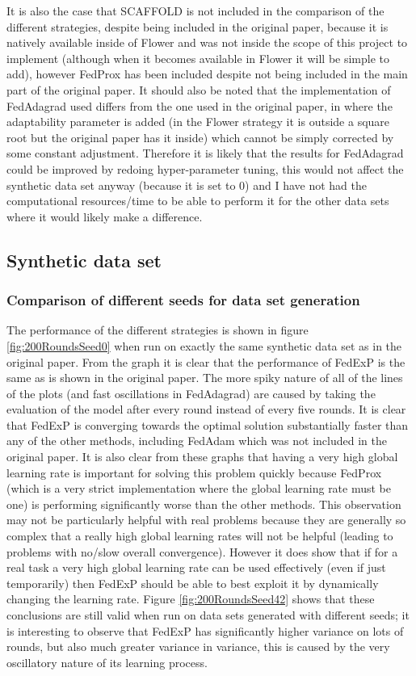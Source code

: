 \documentclass{article}
\begin{document}
It is also the case that SCAFFOLD is not included in the comparison of the different strategies, despite being included in the original paper, because it is natively available inside of Flower and was not inside the scope of this project to implement (although when it becomes available in Flower it will be simple to add), however FedProx has been included despite not being included in the main part of the original paper.  It should also be noted that the implementation of FedAdagrad used differs from the one used in the original paper, in where the adaptability parameter is added (in the Flower strategy it is outside a square root but the original paper has it inside) which cannot be simply corrected by some constant adjustment.  Therefore it is likely that the results for FedAdagrad could be improved by redoing hyper-parameter tuning, this would not affect the synthetic data set anyway (because it is set to 0) and I have not had the computational resources/time to be able to perform it for the other data sets where it would likely make a difference.

\subsection{Synthetic data set}

\subsubsection{Comparison of different seeds for data set generation}

The performance of the different strategies is shown in figure \ref{fig:200RoundsSeed0} when run on exactly the same synthetic data set as in the original paper.  From the graph it is clear that the performance of FedExP is the same as is shown in the original paper.  The more spiky nature of all of the lines of the plots (and fast oscillations in FedAdagrad) are caused by taking the evaluation of the model after every round instead of every five rounds.  It is clear that FedExP is converging towards the optimal solution substantially faster than any of the other methods, including FedAdam which was not included in the original paper.  It is also clear from these graphs that having a very high global learning rate is important for solving this problem quickly because FedProx (which is a very strict implementation where the global learning rate must be one) is performing significantly worse than the other methods.  This observation may not be particularly helpful with real problems because they are generally so complex that a really high global learning rates will not be helpful (leading to problems with no/slow overall convergence).  However it does show that if for a real task a very high global learning rate can be used effectively (even if just temporarily) then FedExP should be able to best exploit it by dynamically changing the learning rate.  Figure \ref{fig:200RoundsSeed42} shows that these conclusions are still valid when run on data sets generated with different seeds; it is interesting to observe that FedExP has significantly higher variance on lots of rounds, but also much greater variance in variance, this is caused by the very oscillatory nature of its learning process.
\end{document}
